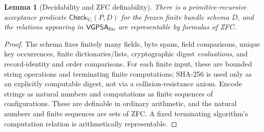\documentclass[11pt]{article}
\newtheorem{lemma}[definition]{Lemma}
\theoremstyle{remark}
\begin{document}
\begin{lemma}[Decidability and ZFC definability]
There is a primitive-recursive acceptance predicate $\mathsf{Check}_{V_*}(P,D)$ for the frozen finite bundle schema $D$, and the relations appearing in $\mathsf{VGPSA}_{\rm fin}$ are representable by formulas of ZFC.
\end{lemma}
\begin{proof}
The schema fixes finitely many fields, byte spans, field comparisons, unique key occurrences, finite dictionaries/lists, cryptographic digest \emph{evaluations}, and record-identity and order comparisons. For each finite input, these are bounded string operations and terminating finite computations; SHA-256 is used only as an explicitly computable digest, not via a collision-resistance axiom. Encode strings as natural numbers and computations as finite sequences of configurations. These are definable in ordinary arithmetic, and the natural numbers and finite sequences are sets of ZFC. A fixed terminating algorithm's computation relation is arithmetically representable.\end{proof}
\end{document}
